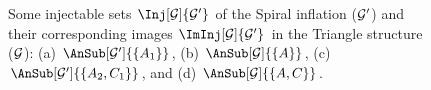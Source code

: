 \documentclass[aps, 10pt, english, twoside, pra, nofootinbib, tightenlines, longbibliography, superscriptaddress]{revtex4-1}
\begin{document}
\begin{nscenter}
\begin{figure}
\begin{subfigure}[b]{.23\linewidth}
    \caption{}
    \label{fig:spiral_inflation_inj2}
    \end{subfigure}
    \begin{subfigure}[b]{.23\linewidth}
    \caption{}
    \label{fig:spiral_inflation_iminj2}
    \end{subfigure}
    \caption{Some injectable sets $\Inj[\graph]{\graph'}$ of the Spiral inflation ($\mathcal{G}'$) and their corresponding images $\ImInj[\graph]{\graph'}$ in the Triangle structure ($\mathcal{G}$): (a) $\AnSub[\graph']{\bc{A_1}}$, (b) $\AnSub[\graph]{\bc{A}}$, (c) $\AnSub[\graph']{\bc{A_2, C_1}}$, and (d) $\AnSub[\graph]{\bc{A,C}}$.}
    \label{fig:injectablesets}
    \end{figure}
    \end{nscenter}
\end{document}
